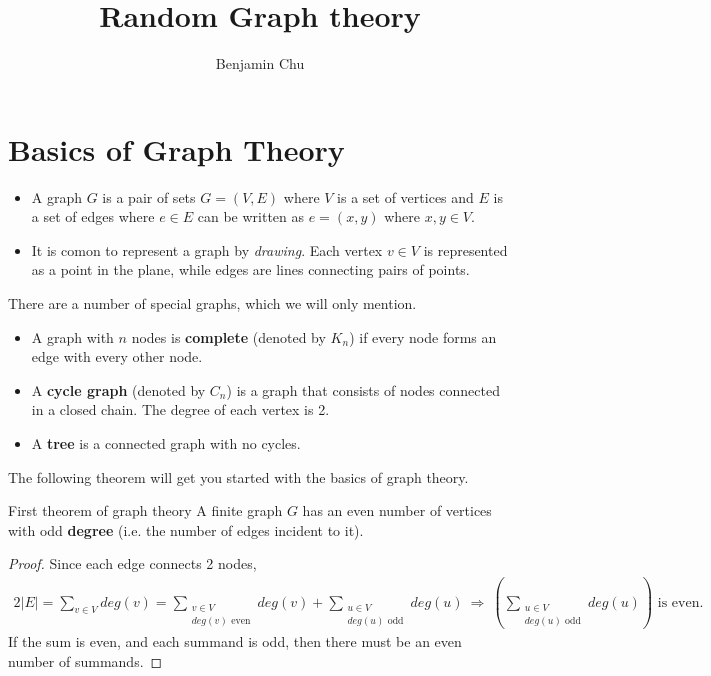 \documentclass[./some_latex_template.tex]{subfiles}
\begin{document}
\title{Random Graph theory}
\author{Benjamin Chu}
\maketitle

\singlespacing

\section{Basics of Graph Theory}

\begin{itemize}
	\item A graph $G$ is a pair of sets $G = (V, E)$ where $V$ is a set of vertices and $E$ is a set of edges where $e \in E$ can be written as $e = (x, y)$ where $x, y \in V$. 
	\item It is comon to represent a graph by \textit{drawing}. Each vertex $v \in V$ is represented as a point in the plane, while edges are lines connecting pairs of points. 
\end{itemize}

\noindent There are a number of special graphs, which we will only mention. 
\begin{itemize}
	\item A graph with $n$ nodes is \textbf{complete} (denoted by $K_n$) if every node forms an edge with every other node. 
	\item A \textbf{cycle graph} (denoted by $C_n$) is a graph that consists of nodes connected in a closed chain. The degree of each vertex is 2. 
	\item A \textbf{tree} is a connected graph with no cycles. 
\end{itemize}

\noindent The following theorem will get you started with the basics of graph theory.

\begin{theorembox}{First theorem of graph theory}{}
A finite graph $G$ has an even number of vertices with odd \textbf{degree} (i.e. the number of edges incident to it).
\end{theorembox}

\begin{proof}
Since each edge connects 2 nodes, 
\begin{align*}
	2|E| = 	\sum_{v \in V} deg(v) = \sum_{\substack{v \in V\\ deg(v) \text{ even}}} deg(v) + \sum_{\substack{u \in V\\ deg(u) \text{ odd}}} deg(u) \ \Longrightarrow \ \left(\sum_{\substack{u \in V\\ deg(u) \text{ odd}}} deg(u)\right) \text{ is even.}
\end{align*}
If the sum is even, and each summand is odd, then there must be an even number of summands.
\end{proof}
\end{document}
